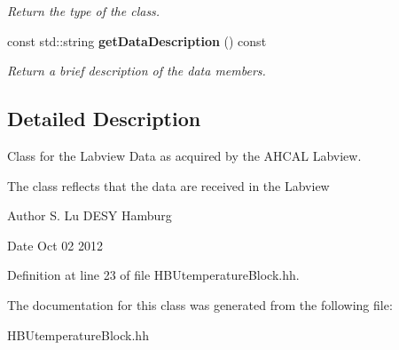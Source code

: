 \begin{DoxyCompactItemize}
\begin{DoxyCompactList}\small\item\em Return the type of the class. \end{DoxyCompactList}\item 
const std\-::string {\bf get\-Data\-Description} () const \label{classCALICE_1_1HBUTemperatureBlock_ae010246fa7084166bee5a5bcb83957c0}

\begin{DoxyCompactList}\small\item\em Return a brief description of the data members. \end{DoxyCompactList}\end{DoxyCompactItemize}


\subsection{Detailed Description}
Class for the Labview Data as acquired by the A\-H\-C\-A\-L Labview. 

The class reflects that the data are received in the Labview \begin{DoxyAuthor}{Author}
S. Lu D\-E\-S\-Y Hamburg 
\end{DoxyAuthor}
\begin{DoxyDate}{Date}
Oct 02 2012 
\end{DoxyDate}


Definition at line 23 of file H\-B\-Utemperature\-Block.\-hh.



The documentation for this class was generated from the following file\-:\begin{DoxyCompactItemize}
\item 
H\-B\-Utemperature\-Block.\-hh\end{DoxyCompactItemize}
